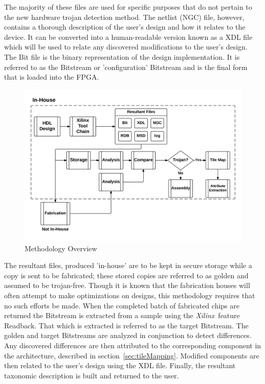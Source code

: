 \documentclass[conference]{IEEEtran}
\newcommand{\Xilinx}{\textit{\gls{Xilinx}}~}
\begin{document}
The majority of these files are used for specific purposes that do not pertain to the new hardware trojan detection method.
The netlist (NGC) file, however, contains a thorough description of the user's design and how it relates to the device.
It can be converted into a human-readable version known as a \acrfull{XDL} file which will be used to relate any discovered modifications to the user's design.
The Bit file is the binary representation of the design implementation.
It is referred to as the \gls{Bitstream} or 'configuration' \gls{Bitstream} and is the final form that is loaded into the \acrshort{FPGA}.
\begin{figure}
	\centering
	\includegraphics[width=1\linewidth]{Figures/methodologyOverview}
	\caption[Methodology Overview]{Methodology Overview}
	\label{fig:methodologyOverview}
\end{figure}
The resultant files, produced 'in-house' are to be kept in secure storage while a copy is sent to be fabricated; these stored copies are referred to as \gls{golden} and assumed to be trojan-free.
Though it is known that the fabrication houses will often attempt to make optimizations on designs, this methodology requires that no such efforts be made.
When the completed batch of fabricated chips are returned the \gls{Bitstream} is extracted from a sample using the \Xilinx feature \gls{Readback}. 
That which is extracted is referred to as the \gls{target} \gls{Bitstream}.
The \gls{golden} and \gls{target} \gls{Bitstream}s are analyzed in conjunction to detect differences.
Any discovered differences are then attributed to the corresponding component in the architecture, described in section~\ref{sec:tileMapping}.
Modified components are then related to the user's design using the \acrshort{XDL} file.
Finally, the resultant taxonomic description is built and returned to the user.
\end{document}
